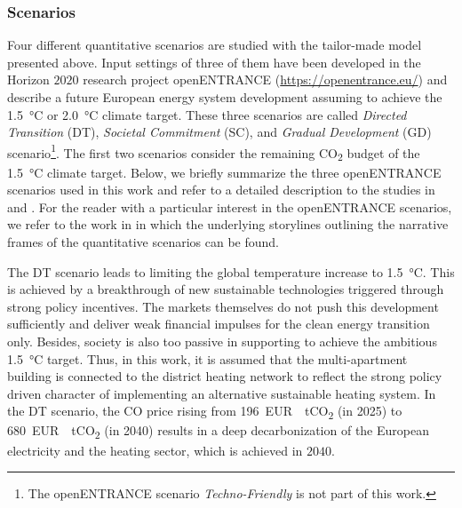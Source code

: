 \subsubsection{Scenarios}\label{sec:scenarios}
Four different quantitative scenarios are studied with the tailor-made model presented above. Input settings of three of them have been developed in the Horizon $2020$ research project openENTRANCE (\url{https://openentrance.eu/}) and describe a future European energy system development assuming to achieve the \SI{1.5}{\degreeCelsius} or \SI{2.0}{\degreeCelsius} climate target. These three scenarios are called \textit{Directed Transition} (DT), \textit{Societal Commitment} (SC), and \textit{Gradual Development} (GD) scenario\footnote{The openENTRANCE scenario \textit{Techno-Friendly} is not part of this work.}. The first two scenarios consider the remaining CO\textsubscript{2} budget of the \SI{1.5}{\degreeCelsius} climate target. Below, we briefly summarize the three openENTRANCE scenarios used in this work and refer to a detailed description to the studies in \cite{auer2020development} and \cite{auer2020quantitative}. For the reader with a particular interest in the openENTRANCE scenarios, we refer to the work in \cite{auer2019quantitative} in which the underlying storylines outlining the narrative frames of the quantitative scenarios can be found.\vspace{0.5cm}

The DT scenario leads to limiting the global temperature increase to \SI{1.5}{\degreeCelsius}. This is achieved by a breakthrough of new sustainable technologies triggered through strong policy incentives. The markets themselves do not push this development sufficiently and deliver weak financial impulses for the clean energy transition only. Besides, society is also too passive in supporting to achieve the ambitious \SI{1.5}{\degreeCelsius} target. Thus, in this work, it is assumed that the multi-apartment building is connected to the district heating network to reflect the strong policy driven character of implementing an alternative sustainable heating system. In the DT scenario, the CO price rising from \SI{196}{EUR \per tCO_{2}} (in 2025) to \SI{680}{EUR \per tCO_{2}} (in 2040) results in a deep decarbonization of the European electricity and the heating sector, which is achieved in $2040$.\vspace{0.5cm}

